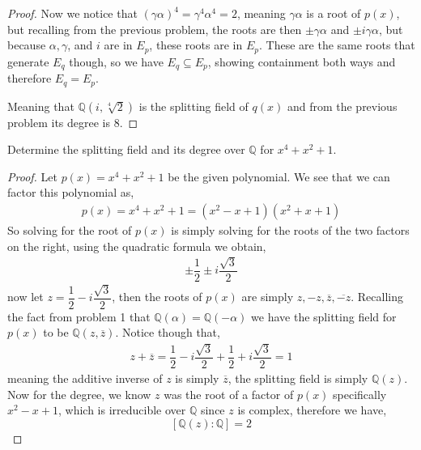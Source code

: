 \documentclass[11pt]{article}
\newenvironment{problem}[2][Problem\!]{\begin{trivlist}
\item[\hskip \labelsep {\bfseries #1}\hskip \labelsep {\bfseries #2}]}{\end{trivlist}}
\newcommand{\qq}{\mathbb Q}   %
\newcommand{\lrb}[1]{\left[#1\right]}
\begin{document}
\begin{example}
\begin{proof}
        Now we notice that $(\gamma\alpha)^{4} = \gamma^{4}\alpha^{4} = 2$, meaning $\gamma\alpha$ is a root of $p(x)$, but recalling from the previous problem, the roots are then $\pm \gamma\alpha$ and $\pm i \gamma \alpha$, but because $\alpha, \gamma$, and $i$ are in $E_p$, these roots are in $E_p$. These are the same roots that generate $E_q$ though, so we have $E_q\subseteq E_p$, showing containment both ways and therefore $E_q = E_p$. 

        Meaning that $\qq(i, \sqrt[4]{2})$ is the splitting field of $q(x)$ and from the previous problem its degree is $8$. 
    \end{proof}
\end{example}

\vspace*{.5in}

\begin{problem}{13.4.3}
    Determine the splitting field and its degree over $\qq$ for $x^{4} +x^{2} +1$.
\end{problem}
\begin{example}
    \begin{proof}
        Let $p(x) = x^{4} + x^{2} + 1$ be the given polynomial. We see that we can factor this polynomial as,
        \begin{align*}
            p(x) = x^{4} + x^{2} + 1 = (x^{2} -x + 1)(x^{2} + x + 1)
        \end{align*} 
        So solving for the root of $p(x)$ is simply solving for the roots of the two factors on the right, using the quadratic formula we obtain,
        \begin{align*}
             \pm \dfrac{1}{2} \pm i\dfrac{\sqrt3}{2}
        \end{align*}
        now let $ z = \dfrac{1}{2} - i \dfrac{\sqrt3}{2}$, then the roots of $p(x)$ are simply $z, -z, \overline{z}, \overline{-z}$. Recalling the fact from problem 1 that $\qq(\alpha) = \qq(-\alpha)$ we have the splitting field for $p(x)$ to be $\qq(z, \overline z)$. Notice though that,
        \begin{align*}
            z + \overline z = \dfrac{1}{2} - i \dfrac{\sqrt3}{2} + \dfrac{1}{2} + i \dfrac{\sqrt3}{2} = 1
        \end{align*}
        meaning the additive inverse of $z$ is simply $\overline z$, the splitting field is simply $\qq(z)$. Now for the degree, we know $z$ was the root of a factor of $p(x)$ specifically $x^{2} -x + 1$, which is irreducible over $\qq$ since $z$ is complex, therefore we have,
        \[\lrb{\qq(z) : \qq} = 2\]
    \end{proof}
\end{example}
\end{document}
